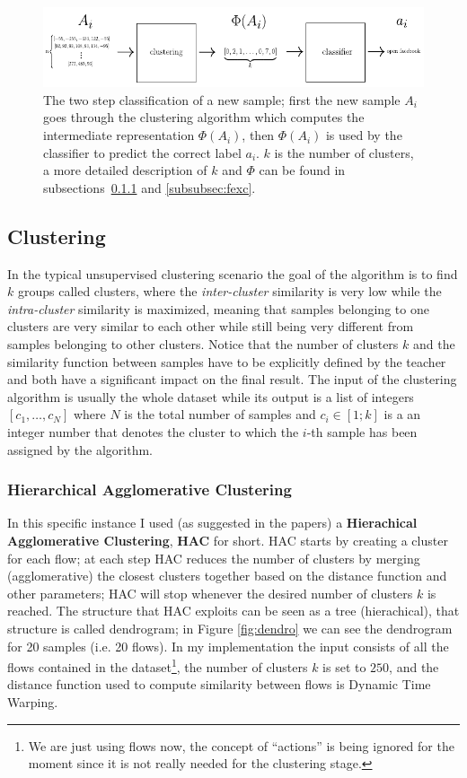 \begin{figure}[h]
 \centering
 \includegraphics{images/actual}
 \caption{\small{The two step classification of a new sample; first the new sample $A_i$ goes through the clustering algorithm which computes the intermediate representation $\Phi(A_i)$, then $\Phi(A_i)$ is used by the classifier to predict the correct label $a_i$. $k$ is the number of clusters, a more detailed description of $k$ and $\Phi$ can be found in subsections~\ref{subsubsec:hac} and \ref{subsubsec:fexc}.}}
 \label{fig:actual}
\end{figure}

\subsection{Clustering}
In the typical unsupervised clustering scenario the goal of the algorithm is to find $k$ groups called clusters, where the \textit{inter-cluster} similarity is very low while the \textit{intra-cluster} similarity is maximized, meaning that samples belonging to one clusters are very similar to each other while still being very different from samples belonging to other clusters. Notice that the number of clusters $k$ and the similarity function between samples have to be explicitly defined by the teacher and both have a significant impact on the final result. The input of the clustering algorithm is usually the whole dataset while its output is a list of integers $[c_1,\dots, c_N]$ where $N$ is the total number of samples and $c_i \in [1;k]$ is a an integer number that denotes the cluster to which the $i$-th sample has been assigned by the algorithm.

\subsubsection{Hierarchical Agglomerative Clustering}
\label{subsubsec:hac}
In this specific instance I used (as suggested in the papers) a \textbf{Hierachical Agglomerative Clustering}, \textbf{HAC} for short. HAC starts by creating a cluster for each flow; at each step HAC reduces the number of clusters by merging (agglomerative) the closest clusters together based on the distance function and other parameters; HAC will stop whenever the desired number of clusters $k$ is reached. The structure that HAC exploits can be seen as a tree (hierachical), that structure is called dendrogram; in Figure \ref{fig:dendro} we can see the dendrogram for 20 samples (i.e. 20 flows). In my implementation the input consists of all the flows contained in the dataset\footnote{We are just using flows now, the concept of ``actions'' is being ignored for the moment since it is not really needed for the clustering stage.}, the number of clusters $k$ is set to $250$, and the distance function used to compute similarity between flows is Dynamic Time Warping.

